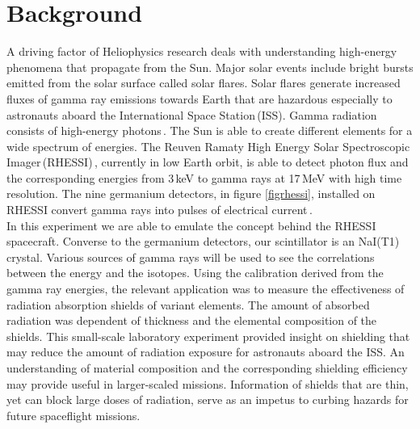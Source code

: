 \documentclass[aps,prl,twocolumn,superscriptaddress,nofootinbib]{revtex4-1}
\begin{document}
\maketitle    %


\section{Background}

A driving factor of Heliophysics research deals with understanding high-energy phenomena that propagate from the Sun. Major solar events include bright bursts emitted from the solar surface called solar flares. Solar flares generate increased fluxes of gamma ray emissions towards Earth that are hazardous especially to astronauts aboard the International Space Station\,(ISS). Gamma radiation consists of high-energy photons\,\cite{1}. The Sun is able to create different elements for a wide spectrum of energies. The Reuven Ramaty High Energy Solar Spectroscopic Imager\,(RHESSI)\,\cite{2}, currently in low Earth orbit, is able to detect photon flux and the corresponding energies from 3\,keV to gamma rays at 17\,MeV with high time resolution. The nine germanium detectors, in figure \ref{figrhessi}, installed on RHESSI convert gamma rays into pulses of electrical current\,\cite{3}.
\\
\indent In this experiment we are able to emulate the concept behind the RHESSI spacecraft. Converse to the germanium detectors, our scintillator is an NaI(T1) crystal. Various sources of gamma rays will be used to see the correlations between the energy and the isotopes. Using the calibration derived from the gamma ray energies, the relevant application was to measure the effectiveness of radiation absorption shields of variant elements. The amount of absorbed radiation was dependent of thickness and the elemental composition of the shields. This small-scale laboratory experiment provided insight on shielding that may reduce the amount of radiation exposure for astronauts aboard the ISS. An understanding of material composition and the corresponding shielding efficiency may provide useful in larger-scaled missions. Information of shields that are thin, yet can block large doses of radiation, serve as an impetus to curbing hazards for future spaceflight missions.
\end{document}
